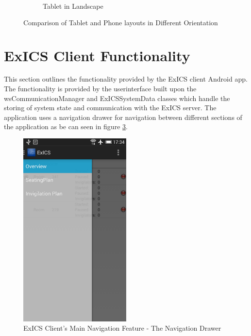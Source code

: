 \begin{figure}[h]
\begin{subfigure}[b]{0.9\textwidth}
		\caption{Tablet in Landscape}
		\label{subfig:tablet_landscape}
	\end{subfigure}
	\caption{Comparison of Tablet and Phone layouts in Different Orientation}
	\label{fig:orientation_comparison}
\end{figure}

\FloatBarrier

\section{ExICS Client Functionality}
\label{sec:ExICSfunctionality}

This section outlines the functionality provided by the ExICS client Android app.  The functionality is provided by the userinterface built upon the wsCommunicationManager and ExICSSystemData classes which handle the storing of system state and communication with the ExICS server.  The application uses a navigation drawer for navigation between different sections of the application as be can seen in figure \ref{fig:nav_drawer_phone}.

\FloatBarrier

\begin{figure}[!htpb]
	\centering
	\includegraphics[width=0.5\textwidth]{"screenshots/phone_portrait_nav_drawer"}
	\caption{ExICS Client's Main Navigation Feature - The Navigation Drawer}
	\label{fig:nav_drawer_phone}
\end{figure}

